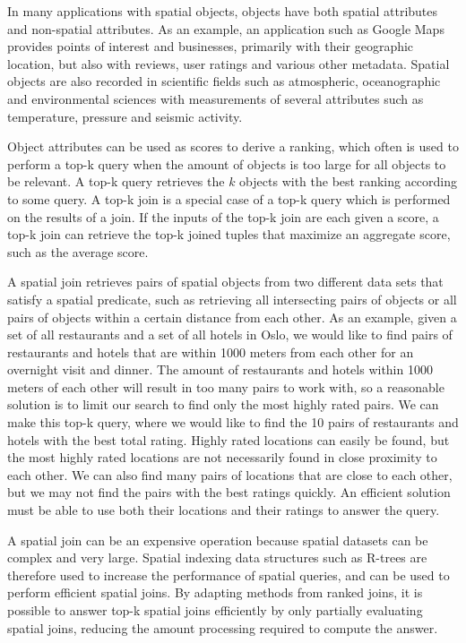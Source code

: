 In many applications with spatial objects, objects have both spatial attributes and non-spatial attributes. As an example, an application such as Google Maps provides points of interest and businesses, primarily with their geographic location, but also with reviews, user ratings and various other metadata. Spatial objects are also recorded in scientific fields such as atmospheric, oceanographic and environmental sciences with measurements of several attributes such as temperature, pressure and seismic activity.

Object attributes can be used as scores to derive a ranking, which often is used to perform a top-k query when the amount of objects is too large for all objects to be relevant. A top-k query retrieves the \(k\) objects with the best ranking according to some query. A top-k join is a special case of a top-k query which is performed on the results of a join. If the inputs of the top-k join are each given a score, a top-k join can retrieve the top-k joined tuples that maximize an aggregate score, such as the average score.

A spatial join retrieves pairs of spatial objects from two different data sets that satisfy a spatial predicate, such as retrieving all intersecting pairs of objects or all pairs of objects within a certain distance from each other. As an example, given a set of all restaurants and a set of all hotels in Oslo, we would like to find pairs of restaurants and hotels that are within 1000 meters from each other for an overnight visit and dinner. The amount of restaurants and hotels within 1000 meters of each other will result in too many pairs to work with, so a reasonable solution is to limit our search to find only the most highly rated pairs. We can make this top-k query, where we would like to find the 10 pairs of restaurants and hotels with the best total rating. Highly rated locations can easily be found, but the most highly rated locations are not necessarily found in close proximity to each other. We can also find many pairs of locations that are close to each other, but we may not find the pairs with the best ratings quickly. An efficient solution must be able to use both their locations and their ratings to answer the query.

A spatial join can be an expensive operation because spatial datasets can be complex and very large. Spatial indexing data structures such as R-trees are therefore used to increase the performance of spatial queries, and can be used to perform efficient spatial joins. By adapting methods from ranked joins, it is possible to answer top-k spatial joins efficiently by only partially evaluating spatial joins, reducing the amount processing required to compute the answer.

